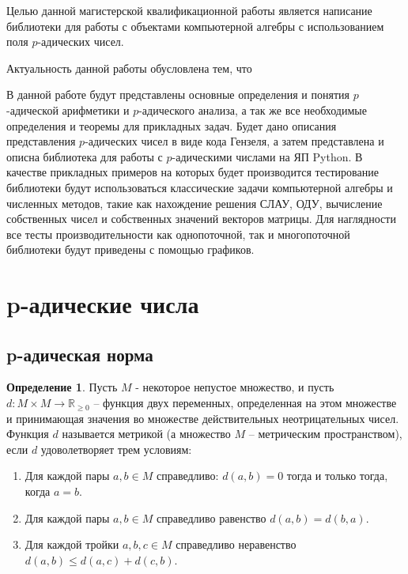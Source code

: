 \documentclass[master, och, diploma, times]{sty/SCWorks}
\theoremstyle{plain}
\theoremstyle{definition}
\newtheorem{defn}{Определение}[section]
\begin{document}
Целью данной магистерской квалификационной работы является написание библиотеки для работы с объектами компьютерной алгебры с использованием поля $p$-адических чисел.

Актуальность данной работы обусловлена тем, что

В данной работе будут представлены основные определения и понятия $p$-адической арифметики и $p$-адического анализа, а так же все необходимые определения и теоремы для прикладных задач. Будет дано описания представления $p$-адических чисел в виде кода Гензеля, а затем представлена и описна библиотека для работы с $p$-адическими числами на ЯП Python. В качестве прикладных примеров на которых будет производится тестирование библиотеки будут использоваться классические задачи компьютерной алгебры и численных методов, такие как нахождение решения СЛАУ, ОДУ, вычисление собственных чисел и собственных значений векторов матрицы. Для наглядности все тесты производительности как однопоточной, так и многопоточной библиотеки будут приведены с помощью графиков.

\section{p-адические числа}

\subsection{p-адическая норма}

\begin{defn}
Пусть $M$ - некоторое непустое множество, и пусть \linebreak ${d: M \times M \rightarrow \mathbb {R}_{\ge0}}$ -- функция двух переменных, определенная на этом множестве и принимающая значения во множестве действительных неотрицательных чисел. Функция $d$ называется метрикой (а множество $M$ -- метрическим пространством), если $d$ удоволетворяет трем условиям:

\begin{enumerate} 
	\item Для каждой пары $a, b \in M$ справедливо: $d(a, b)=0$ тогда и только тогда, когда $a=b$.
	\item Для каждой пары $a, b \in M$ справедливо равенство $d(a, b) = d(b, a)$.
	\item Для каждой тройки $a, b, c \in M$ справедливо неравенство $d(a, b) \le d(a, c) + d(c, b)$.
\end{enumerate}
\end{defn}
\end{document}
